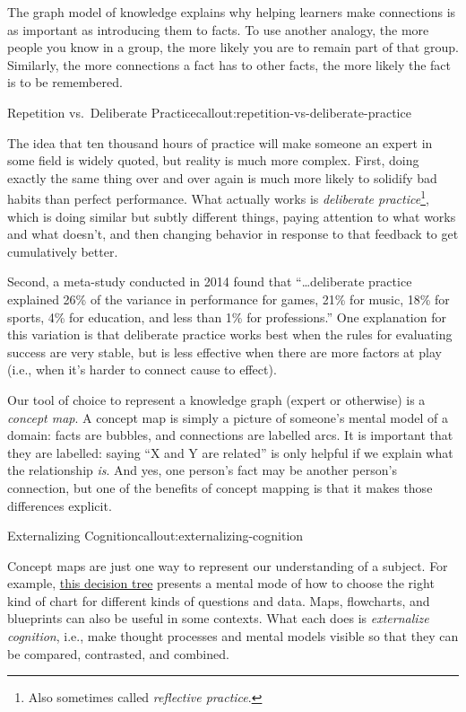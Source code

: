 The graph model of knowledge explains why helping learners make
connections is as important as introducing them to facts.  To use
another analogy, the more people you know in a group, the more likely
you are to remain part of that group.  Similarly, the more connections
a fact has to other facts, the more likely the fact is to be
remembered.

\begin{callout}{Repetition vs.\ Deliberate Practice}{callout:repetition-vs-deliberate-practice}

The idea that ten thousand hours of practice will make someone an
expert in some field is widely quoted, but reality is much more
complex. First, doing exactly the same thing over and over again is
much more likely to solidify bad habits than perfect performance.
What actually works is \emph{deliberate practice}\footnote{Also
sometimes called \emph{reflective practice}.}, which is doing similar
but subtly different things, paying attention to what works and what
doesn't, and then changing behavior in response to that feedback to
get cumulatively better.

Second, a meta-study conducted in 2014 \cite{fixme} found that
``{\ldots}deliberate practice explained 26\% of the variance in
performance for games, 21\% for music, 18\% for sports, 4\% for
education, and less than 1\% for professions.'' One explanation for
this variation is that deliberate practice works best when the rules
for evaluating success are very stable, but is less effective when
there are more factors at play (i.e., when it's harder to connect
cause to effect).

\end{callout}


Our tool of choice to represent a knowledge graph (expert or
otherwise) is a \emph{concept map}.  A concept map is simply a picture
of someone's mental model of a domain: facts are bubbles, and
connections are labelled arcs. It is important that they are labelled:
saying ``X and Y are related'' is only helpful if we explain what the
relationship \emph{is}. And yes, one person's fact may be another
person's connection, but one of the benefits of concept mapping is
that it makes those differences explicit.

\begin{callout}{Externalizing Cognition}{callout:externalizing-cognition}

Concept maps are just one way to represent our understanding of a
subject.  For example, \href{fixme-abela}{this decision tree} presents
a mental mode of how to choose the right kind of chart for different
kinds of questions and data.  Maps, flowcharts, and blueprints can
also be useful in some contexts.  What each does is \emph{externalize
cognition}, i.e., make thought processes and mental models visible so
that they can be compared, contrasted, and combined.

\end{callout}

